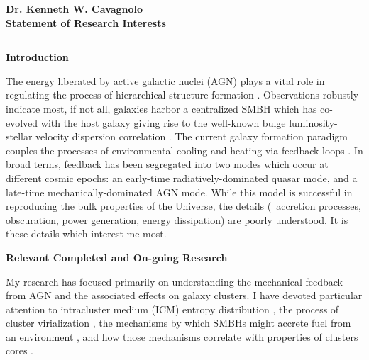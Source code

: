 \documentclass[12pt]{article}
\begin{document}
\begin{center}
{\large \textbf{Dr. Kenneth W. Cavagnolo\\Statement of Research Interests}}
\rule{17cm}{2pt}
\end{center}
\normalsize

{\bfseries{Introduction}}

The energy liberated by active galactic nuclei (AGN) plays a vital
role in regulating the process of hierarchical structure formation
\cite[\eg][]{perseus1, croton06, bower06, saro06, sijacki07,
birzan08}. Observations robustly indicate most, if not all, galaxies
harbor a centralized SMBH which has co-evolved with the host galaxy
giving rise to the well-known bulge luminosity-stellar velocity
dispersion correlation \cite{1995ARA&A..33..581K, magorrian}. The
current galaxy formation paradigm couples the processes of
environmental cooling and heating via feedback loops
\cite{2002MNRAS.333..145N, mcnamrev}. In broad terms, feedback has
been segregated into two modes which occur at different cosmic epochs:
an early-time radiatively-dominated quasar mode, and a late-time
mechanically-dominated AGN mode. While this model is successful in
reproducing the bulk properties of the Universe, the details (\ie\
accretion processes, obscuration, power generation, energy
dissipation) are poorly understood. It is these details which interest
me most.

{\bfseries{Relevant Completed and On-going Research}}

My research has focused primarily on understanding the mechanical
feedback from AGN and the associated effects on galaxy clusters. I
have devoted particular attention to intracluster medium (ICM) entropy
distribution \cite{accept}, the process of cluster virialization
\cite{xrayband}, the mechanisms by which SMBHs might accrete fuel from
an environment \cite{conduction}, and how those mechanisms correlate
with properties of clusters cores \cite{haradent}.
\end{document}
